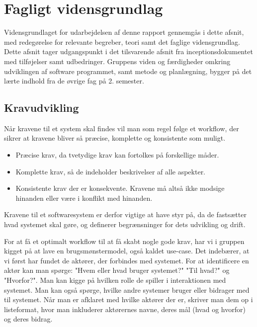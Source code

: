 \section{Fagligt vidensgrundlag}
\vfuzz=100pt
\hfuzz=100pt

Vidensgrundlaget for udarbejdelsen af denne rapport gennemgås i dette afsnit, med redegørelse for relevante begreber, teori samt det faglige vidensgrundlag. Dette afsnit tager udgangspunkt i det tilsvarende afsnit fra inceptionsdokumentet med tilføjelser samt udbedringer. 
Gruppens viden og færdigheder omkring udviklingen af software programmet, samt metode og planlægning, bygger på det lærte indhold fra de øvrige fag på 2. semester. 

\subsection{Kravudvikling}

Når kravene til et system skal findes vil man som regel følge et workflow, der sikrer at kravene bliver så præcise, komplette og konsistente som muligt. 
\begin{itemize}
    \item Præcise krav, da tvetydige krav kan fortolkes på forskellige måder. 
    \item Komplette krav, så de indeholder beskrivelser af alle aspekter. 
    \item Konsistente krav der er konsekvente. Kravene må altså ikke modsige hinanden eller være i konflikt med hinanden.
\end{itemize}
Kravene til et softwaresystem er derfor vigtige at have styr på, da de fastsætter hvad systemet skal gøre, og definerer begrænsninger for dets udvikling og drift. 


For at få et optimalt workflow til at få skabt nogle gode krav, har vi i gruppen kigget på at lave en brugsmønstermodel, også kaldet use-case. 
Det indebærer, at vi først har fundet de aktører, der forbindes med systemet. For at identificere en aktør kan man spørge: "Hvem eller hvad bruger systemet?" "Til hvad?" og "Hvorfor?". Man kan kigge på hvilken rolle de spiller i interaktionen med systemet. Man kan også spørge, hvilke andre systemer bruger eller bidrager med til systemet. Når man er afklaret med hvilke aktører der er, skriver man dem op i listeformat, hvor man inkluderer aktørernes navne, deres mål (hvad og hvorfor) og deres bidrag.

